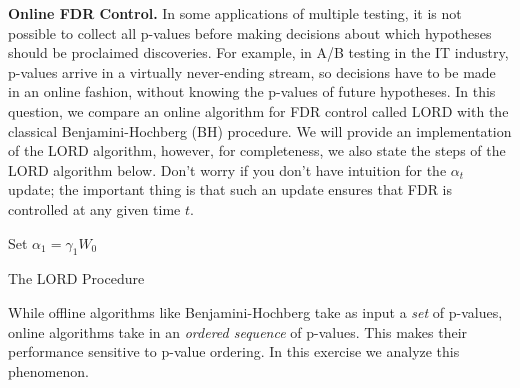 \documentclass[12pt, addpoints]{exam}
\theoremstyle{plain}
\begin{document}
\begin{questions}
     \question[20] \textbf{Online FDR Control.}  In some applications of multiple testing, it is not possible to collect all p-values before making decisions about which hypotheses should be proclaimed discoveries. For example, in A/B testing in the IT industry, p-values arrive in a virtually never-ending stream, so decisions have to be made in an online fashion, without knowing the p-values of future hypotheses. In this question, we compare an online algorithm for FDR control called LORD with the classical Benjamini-Hochberg (BH) procedure. We will provide an implementation of the LORD algorithm, however, for completeness, we also state the steps of the LORD algorithm below. Don't worry if you don't have intuition for the $\alpha_t$ update; the important thing is that such an update ensures that FDR is controlled at any given time $t$.
     
     \begin{algorithm}[H]
\SetAlgoLined
{}
Set $\alpha_1 = \gamma_1 W_0$\newline
 \caption{The LORD Procedure}
\end{algorithm}

While offline algorithms like Benjamini-Hochberg take as input a \emph{set} of p-values, online algorithms take in an \emph{ordered sequence} of p-values. This makes their performance sensitive to p-value ordering. In this exercise we analyze this phenomenon.

\begin{parts}

\end{parts}
\end{questions}
\end{document}
